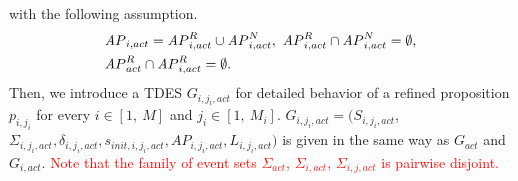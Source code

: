 \documentclass[journal,twoside,web]{IEEEtran}
\newcommand{\AP}{{\textit AP}}
\newcommand{\red}[1]{\textcolor{red}{#1}}
\begin{document}
%
with the following assumption.
%
\begin{align}
&\AP_{i,act}=\AP_{i,act}^R \cup \AP_{i,act}^N,~
\AP_{i,act}^R \cap \AP_{i,act}^N=\emptyset,\notag\\
&\AP_{act}^R \cap \AP_{i,act}^R =\emptyset.\notag
\end{align}
Then, we introduce a TDES $G_{i,j_i,act}$ for detailed behavior of a refined proposition $p_{i,j_i}$ for every $i\in[1,~M]$ and $j_i\in [1,~M_i]$.
$G_{i,j_i,act}=(S_{i,{j_i},act}$, $\Sigma_{i,{j_i},act},\delta_{i,{j_i},act},s_{init,i,{j_i},act},AP_{i,{j_i},act},L_{i,{j_i},act})$ is given in the same way as $G_{act}$ and $G_{i,act}$.
\red{Note that the family of event sets $\Sigma_{act}$, $\Sigma_{i, act}$, $\Sigma_{i,j,act}$ is pairwise disjoint.}

\begin{comment}

In the middle level, there are $M$ TDESs denoted by $G_{i,act}$ for $i \in [1,\ M]$.
At the bottom level, there are $M_i$ TDESs, denoted by $G_{i,{j_i},act}$ for $j_i\in [1,~M_i]$, whose corresponding TDES at next upper-level is $G_{i,act}$ for each $i \in [1,\ M]$.
$G_{act}$ is given by $G_{act}=(S_{act},\Sigma_{act},\delta_{act},s_{init,act},AP_{act},L_{act})$.
Moreover, for $i \in [1,\ M]$ and $j_i\in [1,~M_i]$, $G_{i,act}$ is given by $G_{i,act}=(S_{i,act},\Sigma_{i,act},\delta_{i,act},s_{init,i,act},AP_{i,act},L_{i,act})$, and $G_{i,{j_i},act}$ is given by $G_{i,{j_i},act}=(S_{i,{j_i},act}$, $\Sigma_{i,{j_i},act},\delta_{i,{j_i},act},s_{init,i,{j_i},act},AP_{i,{j_i},act},L_{i,{j_i},act})$.
%
$S_{act}$, $S_{i,act}$, and $S_{i,{j_i},act}$ are the sets of states, $\Sigma_{act}$, $\Sigma_{i,act}$, and $\Sigma_{i,{j_i},act}$ are the sets of events, $\delta_{act}$, $\delta_{i,act}$, and $\delta_{i,{j_i},act}$ are the transition functions, $s_{init,act}$, $s_{init,i,act}$, and $s_{init,i,{j_i},act}$ are the initial states, $AP_{act}$, $AP_{i,act}$, and $AP_{i,{j_i},act}$ are the sets of atomic propositions and $L_{act}$, $L_{i,act}$, and $L_{i,{j_i},act}$ are their corresponding labeling functions.

%


\end{comment}
\end{document}
